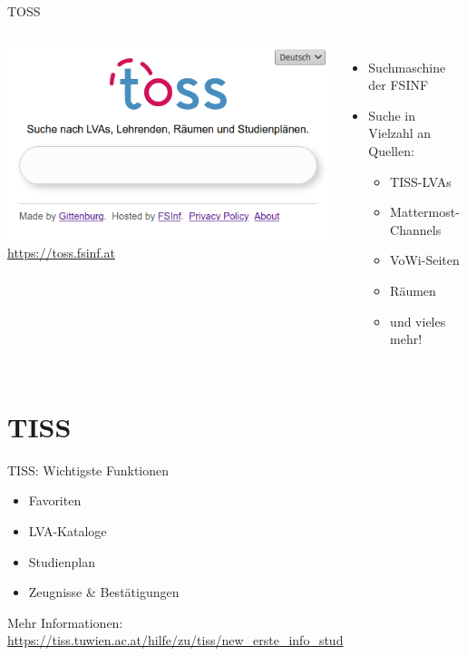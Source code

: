\documentclass{beamer}
\begin{document}
\begin{frame}{TOSS}
  \begin{columns}
      \centering
      \includegraphics[width=\textwidth]{toss.png}
      \url{https://toss.fsinf.at}
      \begin{itemize}
        \item Suchmaschine der FSINF
        \item Suche in Vielzahl an Quellen:
        \begin{itemize}
            \item TISS-LVAs
            \item Mattermost-Channels
            \item VoWi-Seiten
            \item Räumen
            \item und vieles mehr!
        \end{itemize}
      \end{itemize}
  \end{columns}
\end{frame}

\section{TISS}
\begin{frame}{TISS: Wichtigste Funktionen}
    \begin{itemize}
        \item Favoriten
        \item LVA-Kataloge
        \item Studienplan
        \item Zeugnisse \& Bestätigungen
    \end{itemize}
    \vspace{2cm}
    \footnotesize Mehr Informationen: \\
    \centering \url{https://tiss.tuwien.ac.at/hilfe/zu/tiss/new_erste_info_stud}
\end{frame}
\end{document}
